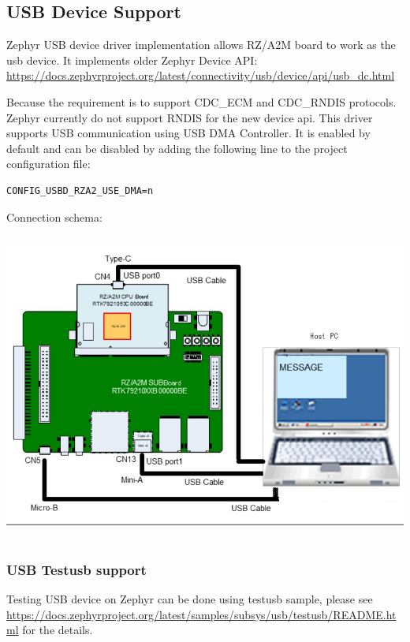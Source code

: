 \documentclass[11pt,a4paper,oneside]{article}
\begin{document}
\subsection{USB Device Support}\label{usb-support}

Zephyr USB device driver implementation allows RZ/A2M board to work as the usb device.
It implements older Zephyr Device API:
\url{https://docs.zephyrproject.org/latest/connectivity/usb/device/api/usb_dc.html}

Because the requirement is to support CDC\_ECM and CDC\_RNDIS protocols. Zephyr currently
do not support RNDIS for the new device api.
This driver supports USB communication using USB DMA Controller. It is enabled by default and can be disabled by adding the following line to the project configuration file:

\begin{lstlisting}
CONFIG_USBD_RZA2_USE_DMA=n
\end{lstlisting}

Connection schema:

\includegraphics[width=6.5in,height=4in]{./media/usb.jpg}

\subsubsection{USB Testusb support}\label{testusb-usb-support}

Testing USB device on Zephyr can be done using testusb sample, please see
\url{https://docs.zephyrproject.org/latest/samples/subsys/usb/testusb/README.html}
for the details.
\end{document}
